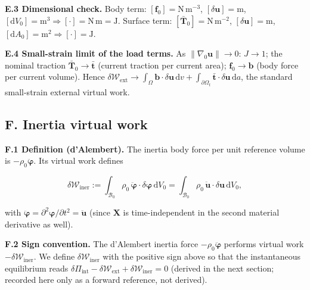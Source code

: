 \documentclass[11pt]{article}
\begin{document}
\textbf{E.3 Dimensional check.} Body term: $[\mathbf{f}_{0}]=\mathrm{N\,m^{-3}}$, $[\delta\mathbf{u}]=\mathrm{m}$, $[\mathrm{d}V_{0}]=\mathrm{m^{3}}\Rightarrow[\cdot]=\mathrm{N\,m}=\mathrm{J}$. Surface term: $[\bar{\mathbf{T}}_{0}]=\mathrm{N\,m^{-2}}$, $[\delta\mathbf{u}]=\mathrm{m}$, $[\mathrm{d}A_{0}]=\mathrm{m^{2}}\Rightarrow[\cdot]=\mathrm{J}$. \checkmark

\textbf{E.4 Small-strain limit of the load terms.} As $\|\nabla_{0}\mathbf{u}\|\to0$: $J\to1$; the nominal traction $\bar{\mathbf{T}}_{0}\to\bar{\mathbf{t}}$ (current traction per current area); $\mathbf{f}_{0}\to\mathbf{b}$ (body force per current volume). Hence $\delta\mathcal{W}_{\mathrm{ext}}\to\int_{\Omega}\mathbf{b}\cdot\delta\mathbf{u}\,\mathrm{d}v+\int_{\partial\Omega_{t}}\bar{\mathbf{t}}\cdot\delta\mathbf{u}\,\mathrm{d}a$, the standard small-strain external virtual work.

\subsection{F. Inertia virtual work}

\textbf{F.1 Definition (d'Alembert).} The inertia body force per unit reference volume is $-\rho_{0}\ddot{\boldsymbol{\varphi}}$. Its virtual work defines

\begin{equation}
\delta\mathcal{W}_{\mathrm{iner}}
:= \int_{\mathcal{B}_{0}}
     \rho_{0}\,\ddot{\boldsymbol{\varphi}}\cdot\delta\boldsymbol{\varphi}\,
     \mathrm{d}V_{0}
 = \int_{\mathcal{B}_{0}}
     \rho_{0}\,\ddot{\mathbf{u}}\cdot\delta\mathbf{u}\,
     \mathrm{d}V_{0},
\label{rn:Winer}
\end{equation}

with $\ddot{\boldsymbol{\varphi}}=\partial^{2}\boldsymbol{\varphi}/\partial t^{2}=\ddot{\mathbf{u}}$ (since $\mathbf{X}$ is time-independent in the second material derivative as well).

\textbf{F.2 Sign convention.} The d'Alembert inertia force $-\rho_{0}\ddot{\boldsymbol{\varphi}}$ performs virtual work $-\delta\mathcal{W}_{\mathrm{iner}}$. We define $\delta\mathcal{W}_{\mathrm{iner}}$ with the positive sign above so that the instantaneous equilibrium reads $\delta\Pi_{\mathrm{int}}-\delta\mathcal{W}_{\mathrm{ext}}+\delta\mathcal{W}_{\mathrm{iner}}=0$ (derived in the next section; recorded here only as a forward reference, not derived).
\end{document}
